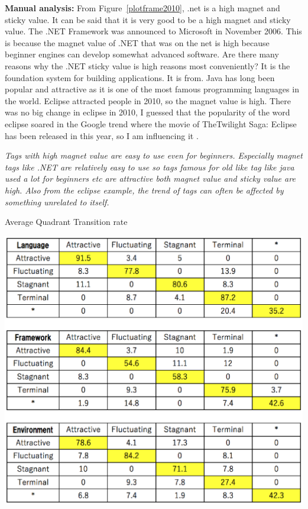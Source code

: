 \documentclass[conference]{IEEEtran}
\begin{document}
\textbf{Manual analysis:}
From Figure~\ref{plotframe2010}, .net is a high magnet and sticky value. It can be said that it is very good to be a high magnet and sticky value. The .NET Framework was announced to Microsoft in November 2006. This is because the magnet value of .NET that was on the net is high because beginner engines can develop somewhat advanced software. Are there many reasons why the .NET sticky value is high reasons most conveniently? It is the foundation system for building applications. It is from. Java has long been popular and attractive as it is one of the most famous programming languages ​​in the world. Eclipse attracted people in 2010, so the magnet value is high. There was no big change in eclipse in 2010, I guessed that the popularity of the word eclipse soared in the Google trend where the movie of TheTwilight Saga: Eclipse has been released in this year, so I am influencing it .\medskip
 
\begin{oframed}
 \emph{Tags with high magnet value are easy to use even for beginners. Especially magnet tags like .NET are relatively easy to use so tags famous for old like tag like java used a lot for beginners etc are attractive both magnet value and sticky value are high. Also from the eclipse example, the trend of tags can often be affected by something unrelated to itself.}
\end{oframed}
\medskip




\begin{table}[h]
 \centering
 \caption{Average Quadrant Transition rate}
 \includegraphics[width=.9\hsize]{img/LanguageAFST.eps} 
 \label{table1} 
\end{table}
\end{document}
